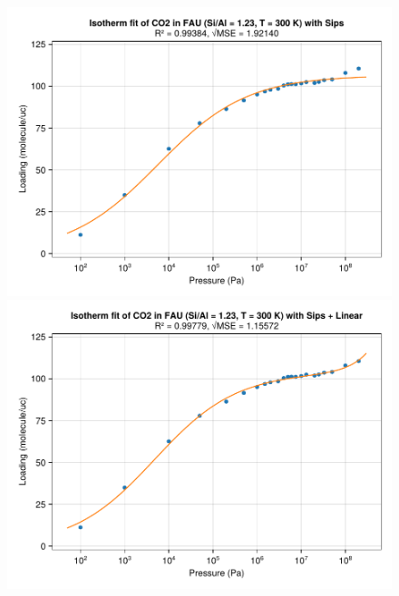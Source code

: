 \documentclass[main.tex]{subfiles}
\begin{document}
\begin{figure}
	\begin{minipage}{0.49\columnwidth}
		\includegraphics[width=\columnwidth]{figures/isotherms/Sips.pdf}
	\end{minipage}\hfill%
	\begin{minipage}{0.49\columnwidth}
		\includegraphics[width=\columnwidth]{figures/isotherms/Sips + Linear.pdf}
	\end{minipage}
	

\end{figure}
\end{document}
